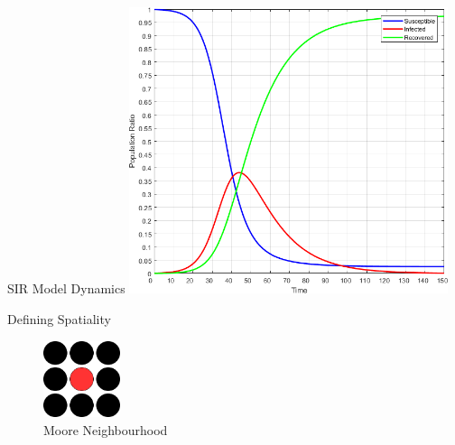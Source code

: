 \documentclass{beamer}
\begin{document}
\begin{frame}{SIR Model Dynamics}
  \center
  \includegraphics[width=0.7\textwidth]{./fig/SIR_SD_001dt.png}
\end{frame}

\begin{frame}[fragile]{Defining Spatiality}
\begin{figure}
\begin{center}
\includegraphics[width=0.2\textwidth]{./fig/moore.png}
\caption*{Moore Neighbourhood}
\end{center}
\end{figure}
\end{frame}
\end{document}

